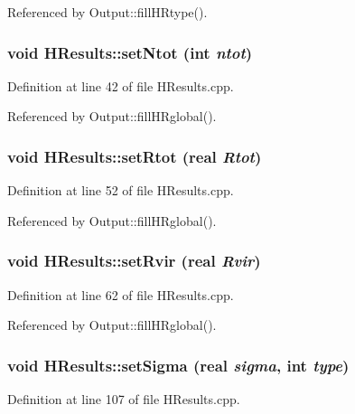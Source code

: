 Referenced by Output::fillHRtype().

\subsubsection[{setNtot}]{\setlength{\rightskip}{0pt plus 5cm}void HResults::setNtot (int {\em ntot})}\label{classHResults_acaef1c57079dba4a372549c01f596fec}


Definition at line 42 of file HResults.cpp.



Referenced by Output::fillHRglobal().

\subsubsection[{setRtot}]{\setlength{\rightskip}{0pt plus 5cm}void HResults::setRtot ({\bf real} {\em Rtot})}\label{classHResults_a70efb9c0b0afaa22be7d29efb601291a}


Definition at line 52 of file HResults.cpp.



Referenced by Output::fillHRglobal().

\subsubsection[{setRvir}]{\setlength{\rightskip}{0pt plus 5cm}void HResults::setRvir ({\bf real} {\em Rvir})}\label{classHResults_ae90ebd38d753f909d52396672dd3aa84}


Definition at line 62 of file HResults.cpp.



Referenced by Output::fillHRglobal().

\subsubsection[{setSigma}]{\setlength{\rightskip}{0pt plus 5cm}void HResults::setSigma ({\bf real} {\em sigma}, \/  int {\em type})}\label{classHResults_a3aea44b516fd1a68983fee0f3de77ea7}


Definition at line 107 of file HResults.cpp.



